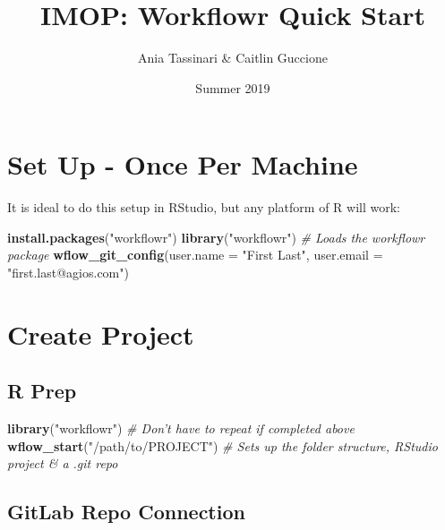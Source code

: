 \documentclass[openany]{article}
\title{IMOP: Workflowr Quick Start}
\author{Ania Tassinari \& Caitlin Guccione}
\date{Summer 2019}
\newenvironment{Shaded}{\begin{snugshade}}{\end{snugshade}}
\newcommand{\CommentTok}[1]{\textcolor[rgb]{0.56,0.35,0.01}{\textit{#1}}}
\newcommand{\DataTypeTok}[1]{\textcolor[rgb]{0.13,0.29,0.53}{#1}}
\newcommand{\KeywordTok}[1]{\textcolor[rgb]{0.13,0.29,0.53}{\textbf{#1}}}
\newcommand{\NormalTok}[1]{#1}
\newcommand{\StringTok}[1]{\textcolor[rgb]{0.31,0.60,0.02}{#1}}
\begin{document}
\maketitle

\hypertarget{set-up---once-per-machine}{%
\section{Set Up - Once Per Machine}\label{set-up---once-per-machine}}

It is ideal to do this setup in RStudio, but any platform of R will work:

\begin{Shaded}
\begin{Highlighting}[]
\KeywordTok{install.packages}\NormalTok{(}\StringTok{"workflowr"}\NormalTok{)}
\KeywordTok{library}\NormalTok{(}\StringTok{"workflowr"}\NormalTok{) }\CommentTok{# Loads the workflowr package}
\KeywordTok{wflow_git_config}\NormalTok{(}\DataTypeTok{user.name =} \StringTok{"First Last"}\NormalTok{, }\DataTypeTok{user.email =} \StringTok{"first.last@agios.com"}\NormalTok{)}
\end{Highlighting}
\end{Shaded}

\hypertarget{create-project}{%
\section{Create Project}\label{create-project}}

\hypertarget{r-prep}{%
\subsection{R Prep}\label{r-prep}}

\begin{Shaded}
\begin{Highlighting}[]
\KeywordTok{library}\NormalTok{(}\StringTok{"workflowr"}\NormalTok{) }\CommentTok{# Don't have to repeat if completed above}
\KeywordTok{wflow_start}\NormalTok{(}\StringTok{"/path/to/PROJECT"}\NormalTok{) }\CommentTok{# Sets up the folder structure, RStudio project & a .git repo}
\end{Highlighting}
\end{Shaded}

\hypertarget{gitlab-repo-connection}{%
\subsection{GitLab Repo Connection}\label{gitlab-repo-connection}}
\end{document}
